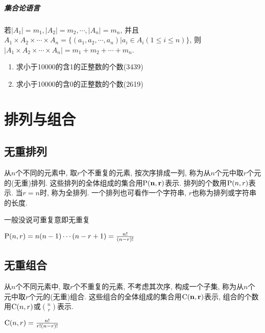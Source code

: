         \subparagraph{集合论语言}

            若$|A_1|=m_1, |A_2|=m_2, \cdots, |A_n|=m_n$, 并且$A_1\times A_2\times \cdots \times A_n=\{(a_1,a_2,\cdots,a_n)|a_i\in A_i(1\leqslant i\leqslant n)\}$, 则$|A_1\times A_2\times\cdots\times A_n|=m_1+m_2+\cdots+m_n$.

        \begin{example}
            \begin{enumerate}
                \item 求小于10000的含1的正整数的个数(3439)
                \item 求小于10000的含0的正整数的个数(2619)
            \end{enumerate}
        \end{example}

\section{排列与组合}

    \subsection{无重排列}

        \begin{definition}[无重排列]
            从$n$个不同的元素中, 取$r$个不重复的元素, 按次序排成一列, 称为从$n$个元中取$r$个元的\textsf{(无重)排列}. 这些排列的全体组成的集合用$\mathbf{\P(n,r)}$表示. 排列的个数用$\P(n,r)$表示. 当$r=n$时, 称为\textsf{全排列}. 一个排列也可看作一个字符串, $r$也称为排列或字符串的长度. 
        \end{definition}

        \begin{caution}
            一般没说可重复意即无重复
        \end{caution}

        \begin{theorem}
            $\P(n,r)=n(n-1)\cdots(n-r+1)=\frac{n!}{(n-r)!}$
        \end{theorem}

    \subsection{无重组合}

        \begin{definition}[无重组合]
            从$n$个不同元素中, 取$r$个不重复的元素, 不考虑其次序, 构成一个子集, 称为从$n$个元中取$r$个元的\textsf{(无重)组合}. 这些组合的全体组成的集合用$\mathbf{\C(n,r)}$表示, 组合的个数用$\C(n,r)$或$n\choose r$表示.
        \end{definition}
        \begin{theorem}
            $\C(n,r)=\frac{n!}{r!(n-r)!}$
        \end{theorem}

